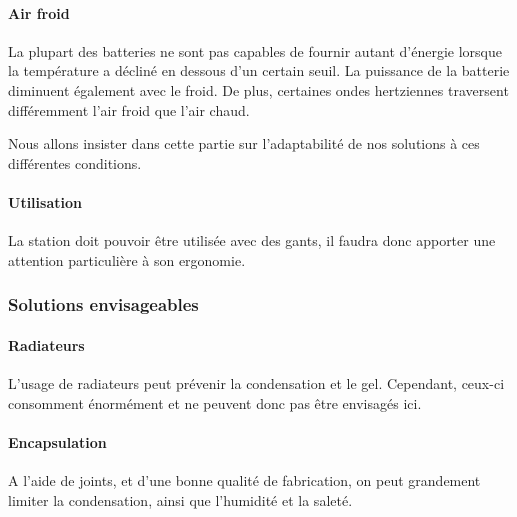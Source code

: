 \paragraph{Air froid}

La plupart des batteries ne sont pas capables de fournir autant d'énergie lorsque la température a décliné en dessous d'un certain seuil. La puissance de la batterie diminuent également avec le froid.
De plus, certaines ondes hertziennes traversent différemment l'air froid que l'air chaud\footnotemark.


Nous allons insister dans cette partie sur l'adaptabilité de nos solutions à ces différentes conditions.


\paragraph{Utilisation}

La station doit pouvoir être utilisée avec des gants, il faudra donc apporter une attention particulière à son ergonomie.

\subsubsection{Solutions envisageables}

\paragraph{Radiateurs}

L'usage de radiateurs peut prévenir la condensation et le gel. Cependant, ceux-ci consomment énormément et ne peuvent donc pas être envisagés ici.

\paragraph{Encapsulation}

A l'aide de joints, et d'une bonne qualité de fabrication, on peut grandement limiter la condensation, ainsi que l'humidité et la saleté.

